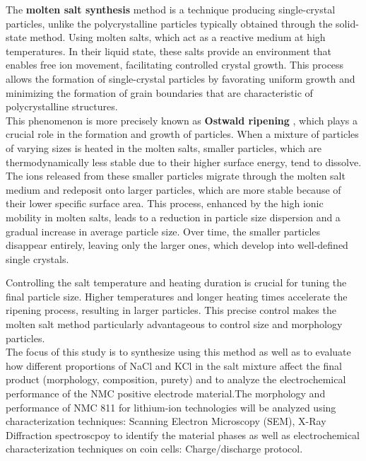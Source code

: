 \documentclass{article}
\begin{document}
The \textbf{molten salt synthesis} method is a technique producing single-crystal particles, unlike the polycrystalline particles typically obtained through the solid-state method. Using molten salts, which act as a reactive medium at high temperatures. In their liquid state, these salts provide an environment that enables free ion movement, facilitating controlled crystal growth. This process allows the formation of single-crystal particles by favorating uniform growth and minimizing the formation of grain boundaries that are characteristic of polycrystalline structures. \cite{Heuristics}
\\

This phenomenon is more precisely known as \textbf{Ostwald ripening} \cite{oswald}, which plays a crucial role in the formation and growth of particles. When a mixture of particles of varying sizes is heated in the molten salts, smaller particles, which are thermodynamically less stable due to their higher surface energy, tend to dissolve. The ions released from these smaller particles migrate through the molten salt medium and redeposit onto larger particles, which are more stable because of their lower specific surface area. This process, enhanced by the high ionic mobility in molten salts, leads to a reduction in particle size dispersion and a gradual increase in average particle size. Over time, the smaller particles disappear entirely, leaving only the larger ones, which develop into well-defined single crystals.\cite{moltensalt1}

Controlling the salt temperature and heating duration is crucial for tuning the final particle size. Higher temperatures and longer heating times accelerate the ripening process, resulting in larger particles. This precise control makes the molten salt method particularly advantageous to control size and morphology particles. \cite{moltensalt1} \\

The focus of this study is to synthesize using this method as well as to evaluate how different proportions of NaCl and KCl in the salt mixture affect the final product (morphology, composition, purety) and to analyze the electrochemical performance of the NMC positive electrode material.\cite{meltingp}The morphology and performance of NMC 811 for lithium-ion technologies will be analyzed using characterization techniques: Scanning Electron Microscopy (SEM), X-Ray Diffraction spectroscpoy to identify the material phases as well as electrochemical characterization techniques on coin cells: Charge/discharge protocol. \\
\end{document}
